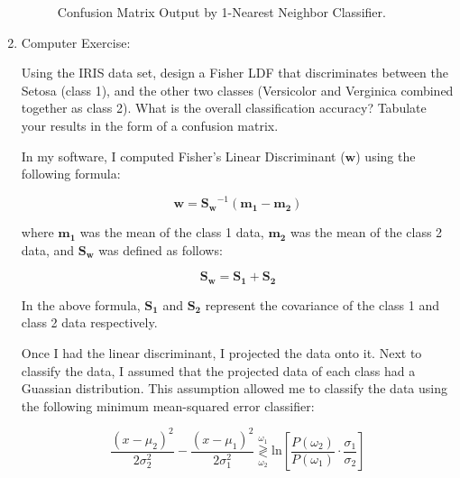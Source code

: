 \documentclass[fleqn]{article}
\begin{document}
\begin{enumerate}
		\begin{figure}[H]				
			\centerline{}
			\caption{Confusion Matrix Output by 1-Nearest Neighbor Classifier.}
			\label{1nn_confusion_matrix}
		\end{figure}
		
		\pagebreak
		
		\item Computer Exercise:
		
		Using the IRIS data set, design a Fisher LDF that discriminates between the Setosa (class 1), and the other two classes (Versicolor and Verginica combined together as class 2). What is the overall classification accuracy? Tabulate your results in the form of a confusion matrix.
		
		In my software, I computed Fisher's Linear Discriminant ($\mathbf{w}$) using the following formula:
		
		\begin{equation*}
			\mathbf{w} = \mathbf{S_w}^{-1}(\mathbf{m_1} - \mathbf{m_2})
		\end{equation*}
		
		where $\mathbf{m_1}$ was the mean of the class 1 data, $\mathbf{m_2}$ was the mean of the class 2 data, and $\mathbf{S_w}$ was defined as follows:
		
		\begin{equation*}
			\mathbf{S_w} = \mathbf{S_1} + \mathbf{S_2}
		\end{equation*}
		
		In the above formula, $\mathbf{S_1}$ and $\mathbf{S_2}$ represent the covariance of the class 1 and class 2 data respectively. 
		
		Once I had the linear discriminant, I projected the data onto it. Next to classify the data, I assumed that the projected data of each class had a Guassian distribution. This assumption allowed me to classify the data using the following minimum mean-squared error classifier:
		
		\begin{equation*}
			\frac{(x - \mu_2)^2}{2\sigma_2^2} - \frac{(x - \mu_1)^2}{2\sigma_1^2} \overset{\omega_1}{\underset{\omega_2}{\gtrless}} \text{ln}\left[\frac{P(\omega_2)}{P(\omega_1)}\cdot\frac{\sigma_1}{\sigma_2}\right]
		\end{equation*}
		

\end{enumerate}
\end{document}
